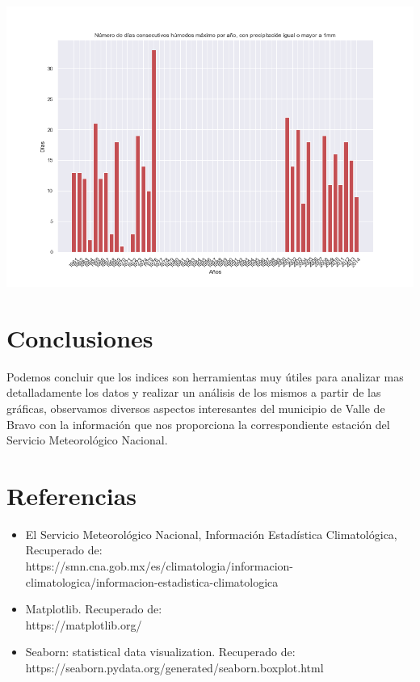 \documentclass[12pt]{article}
\begin{document}
\begin{center}
\includegraphics[scale=0.5]{CWD.png}
\end{center} 



\section{Conclusiones}
Podemos concluir que los indices son herramientas muy útiles para analizar mas detalladamente los datos y realizar un análisis de los mismos a partir de las gráficas, observamos diversos aspectos interesantes del municipio de Valle de Bravo con la información que nos proporciona la correspondiente estación del Servicio Meteorológico Nacional.

\section{Referencias}
\begin{itemize}
\item El Servicio Meteorológico Nacional, Información Estadística Climatológica,\\ Recuperado de:\\ https://smn.cna.gob.mx/es/climatologia/informacion-climatologica/informacion-estadistica-climatologica
\item Matplotlib. Recuperado de:\\ https://matplotlib.org/
\item Seaborn: statistical data visualization. Recuperado de:\\ https://seaborn.pydata.org/generated/seaborn.boxplot.html
\end{itemize}
\end{document}
